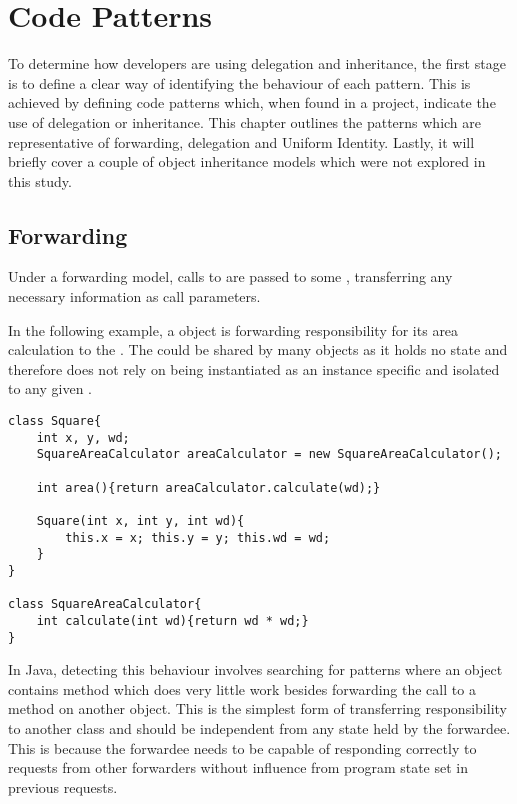 \chapter{Code Patterns}\label{C:bg}
To determine how developers are using delegation and inheritance, the first stage is to define a clear way of identifying the behaviour of each pattern. This is achieved by defining code patterns which, when found in a project, indicate the use of delegation or inheritance. This chapter outlines the patterns which are representative of forwarding, delegation and Uniform Identity. Lastly, it will briefly cover a couple of object inheritance models which were not explored in this study.

\section{Forwarding}
\label{sec:forwarding}
Under a forwarding model, calls to  are passed to some , transferring any necessary information as call parameters.
\newline

In the following example, a  object is forwarding responsibility for its area calculation to the . The  could be shared by many  objects as it holds no state and therefore does not rely on being instantiated as an instance specific and isolated to any given .

\begin{lstlisting}
class Square{
	int x, y, wd;
	SquareAreaCalculator areaCalculator = new SquareAreaCalculator();

	int area(){return areaCalculator.calculate(wd);}

	Square(int x, int y, int wd){
		this.x = x; this.y = y; this.wd = wd;
	}
}

class SquareAreaCalculator{
	int calculate(int wd){return wd * wd;}
}
\end{lstlisting}

In Java, detecting this behaviour involves searching for patterns where an object contains method which does very little work besides forwarding the call to a method on another object. This is the simplest form of transferring responsibility to another class and should be independent from any state held by the forwardee. This is because the forwardee needs to be capable of responding correctly to requests from other forwarders without influence from program state set in previous requests.
\newline

